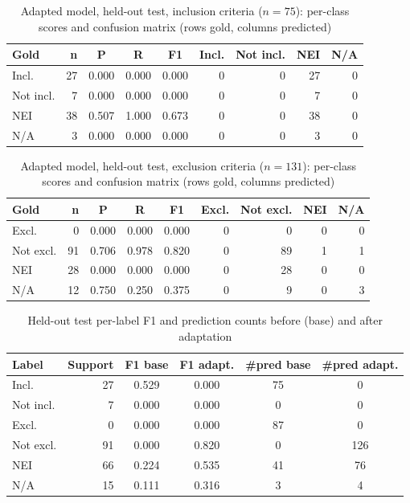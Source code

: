 \begin{table}[t]\centering\caption{Adapted model, held-out test, inclusion criteria ($n=75$): per-class scores and confusion matrix (rows gold, columns predicted)}\label{tab:cls_inclusion}\footnotesize
\begin{tabular}{lrccc|rrrr}
\hline
Gold & n & P & R & F1 & Incl. & Not incl. & NEI & N/A\\\hline
Incl. & 27 & 0.000 & 0.000 & 0.000 & 0 & 0 & 27 & 0\\
Not incl. & 7 & 0.000 & 0.000 & 0.000 & 0 & 0 & 7 & 0\\
NEI & 38 & 0.507 & 1.000 & 0.673 & 0 & 0 & 38 & 0\\
N/A & 3 & 0.000 & 0.000 & 0.000 & 0 & 0 & 3 & 0\\
\hline\end{tabular}
\end{table}

\begin{table}[t]\centering\caption{Adapted model, held-out test, exclusion criteria ($n=131$): per-class scores and confusion matrix (rows gold, columns predicted)}\label{tab:cls_exclusion}\footnotesize
\begin{tabular}{lrccc|rrrr}
\hline
Gold & n & P & R & F1 & Excl. & Not excl. & NEI & N/A\\\hline
Excl. & 0 & 0.000 & 0.000 & 0.000 & 0 & 0 & 0 & 0\\
Not excl. & 91 & 0.706 & 0.978 & 0.820 & 0 & 89 & 1 & 1\\
NEI & 28 & 0.000 & 0.000 & 0.000 & 0 & 28 & 0 & 0\\
N/A & 12 & 0.750 & 0.250 & 0.375 & 0 & 9 & 0 & 3\\
\hline\end{tabular}
\end{table}

\begin{table}[t]\centering\caption{Held-out test per-label F1 and prediction counts before (base) and after adaptation}\label{tab:classes}\footnotesize
\begin{tabular}{lrcccc}
\hline
Label & Support & F1 base & F1 adapt. & \#pred base & \#pred adapt.\\\hline
Incl. & 27 & 0.529 & 0.000 & 75 & 0\\
Not incl. & 7 & 0.000 & 0.000 & 0 & 0\\
Excl. & 0 & 0.000 & 0.000 & 87 & 0\\
Not excl. & 91 & 0.000 & 0.820 & 0 & 126\\
NEI & 66 & 0.224 & 0.535 & 41 & 76\\
N/A & 15 & 0.111 & 0.316 & 3 & 4\\
\hline\end{tabular}
\end{table}

